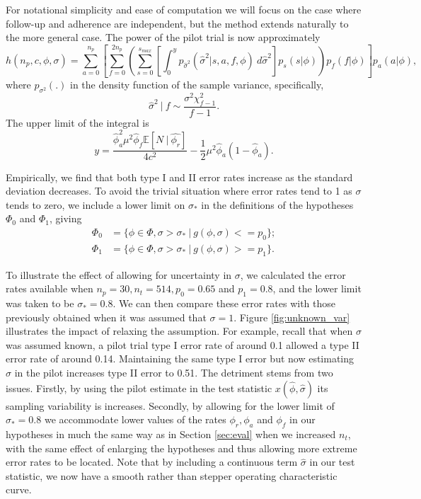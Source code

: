 \documentclass[AMA,STIX1COL]{WileyNJD-v2}
\begin{document}
For notational simplicity and ease of computation we will focus on the case where follow-up and adherence are independent, but the method extends naturally to the more general case. The power of the pilot trial is now approximately 
\begin{equation*}
h(n_p, c, \phi, \sigma) = \sum_{a=0}^{n_p} \left[  \sum_{f=0}^{2n_p} \left( \sum_{s = 0}^{s_{max}} 
\left[ \int_0^y p_{\hat{\sigma}^2}( \hat{\sigma}^2 | s, a, f, \phi) ~ d\hat{\sigma}^2 \right] 
p_s(s | \phi) \right) p_{f}(f |\phi)  \right] p_a(a | \phi),
\end{equation*}
where $p_{\sigma^2}(.)$ in the density function of the sample variance, specifically,
$$
\hat{\sigma}^2 ~|~  f \sim \frac{\sigma^2 \chi^2_{f - 1}}{f - 1}.
$$
The upper limit of the integral is
$$
y = \frac{\hat{\phi}_a^2 \mu^2 \hat{\phi}_f \mathbb{E}[N ~|~ \hat{\phi_r}]}{4c^2} - \frac{1}{2} \mu^2 \hat{\phi}_a (1-\hat{\phi}_a).
$$

Empirically, we find that both type I and II error rates increase as the standard deviation decreases. To avoid the trivial situation where error rates tend to 1 as $\sigma$ tends to zero, we include a lower limit on $\sigma_*$ in the definitions of the hypotheses $\Phi_0$ and $\Phi_1$, giving
\begin{align*}
\Phi_0 &= \{\phi \in \Phi, \sigma > \sigma_*  ~ | ~ g(\phi, \sigma) <= p_0 \}; \\
\Phi_1 &= \{\phi \in \Phi, \sigma > \sigma_* ~ | ~ g(\phi, \sigma) >= p_1 \}.
\end{align*}

To illustrate the effect of allowing for uncertainty in $\sigma$, we calculated the error rates available when $n_p = 30, n_t = 514, p_0 = 0.65$ and $p_1 = 0.8$, and the lower limit was taken to be $\sigma_* = 0.8$. We can then compare these error rates with those previously obtained when it was assumed that $\sigma = 1$. Figure \ref{fig:unknown_var} illustrates the impact of relaxing the assumption. For example, recall that when $\sigma$ was assumed known, a pilot trial type I error rate of around 0.1 allowed a type II error rate of around 0.14. Maintaining the same type I error but now estimating $\sigma$ in the pilot increases type II error to 0.51. The detriment stems from two issues. Firstly, by using the pilot estimate in the test statistic $x(\hat{\phi}, \hat{\sigma})$ its sampling variability is increases. Secondly, by allowing for the lower limit of $\sigma_* = 0.8$ we accommodate lower values of the rates $\phi_r, \phi_a$ and $\phi_f$ in our hypotheses in much the same way as in Section \ref{sec:eval} when we increased $n_t$, with the same effect of enlarging the hypotheses and thus allowing more extreme error rates to be located. Note that by including a continuous term $\hat{\sigma}$ in our test statistic, we now have a smooth rather than stepper operating characteristic curve.
\end{document}
